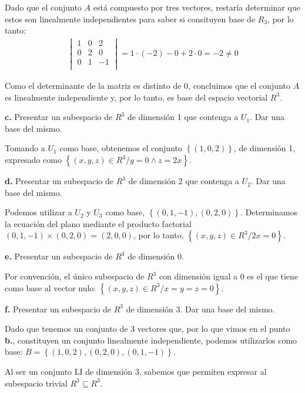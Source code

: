 \documentclass[12pt]{article}
\begin{document}
Dado que el conjunto \(A\) está compuesto por tres vectores,
restaría determinar que estos son linealmente independientes para saber
si consituyen base de \(R_{3}\), por lo tanto:
\begin{align*}
  \begin{vmatrix}
    1 & 0 & 2  \\
    0 & 2 & 0  \\
    0 & 1 & -1 \\
  \end{vmatrix} = 1 \cdot (-2) - 0 + 2 \cdot 0 = \boxed{-2 \neq 0}
\end{align*}

Como el determinante de la matriz es distinto de 0,
concluimos que el conjunto \(A\) es linealmente independiente y,
por lo tanto,
es base del espacio vectorial \(R^{3}\).

\hspace{6mm}\textbf{c.}
Presentar un subespacio de \(R^{3}\) de dimensión 1 que contenga a \(U_{1}\).
Dar una base del mismo.

Tomando a \(U_{1}\) como base, obtenemos el conjunto \(\left\{(1,0,2)\right\}\),
de dimensión 1, expresado como \(\left\{(x,y,z) \in R^{3} / y = 0 \land z=2x \right\}\).

\hspace{6mm}\textbf{d.}
Presentar un subespacio de \(R^{3}\) de dimensión 2 que contenga a \(U_{2}\).
Dar una base del mismo.

Podemos utilizar a \(U_{2}\) y \(U_{3}\) como base, 
\(\left\{(0,1,-1), (0,2,0)\right\}\). 
Determinamos la ecuación del plano mediante el producto factorial 
\((0,1,-1) \times (0,2,0) = (2,0,0)\), por lo tanto,
\(\left\{(x,y,z) \in R^{3} / 2x = 0 \right\}\).

\hspace{6mm}\textbf{e.}
Presentar un subespacio de \(R^{3}\) de dimensión 0.

Por convención, el único subespacio de \(R^{3}\) con dimensión igual a 0 es
el que tiene como base al vector nulo:
\(\left\{(x,y,z) \in R^{3} / x = y = z = 0 \right\}\).

\hspace{6mm}\textbf{f.}
Presentar un subespacio de \(R^{3}\) de dimensión 3.
Dar una base del mismo.

Dado que tenemos un conjunto de 3 vectores que, 
por lo que vimos en el punto \textbf{b.},
constituyen un conjunto linealmente independiente,
podemos utilizarlos como base:
\(B = \left\{(1,0,2), (0,2,0), (0,1,-1)\right\}\).

Al ser un conjunto LI de dimensión 3, 
sabemos que permiten expresar al subespacio trivial \(R^{3} \subseteq R^{3}\).
\end{document}
